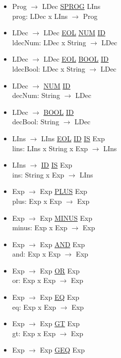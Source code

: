 \documentclass[\main/MemoriaPL.tex]{subfiles}
\begin{document}
    \begin{itemize}
      \item Prog $\rightarrow$ LDec \underline{SPROG} LIns\\
        prog: LDec x LIns $\rightarrow$ Prog
      \item LDec $\rightarrow$ LDec \underline{EOL} \underline{NUM}
        \underline{ID}\\
        ldecNum: LDec x String $\rightarrow$ LDec
      \item LDec $\rightarrow$ LDec \underline{EOL} \underline{BOOL}
        \underline{ID}\\
        ldecBool: LDec x String $\rightarrow$ LDec
      \item LDec $\rightarrow$ \underline{NUM} \underline{ID}\\
        decNum: String $\rightarrow$ LDec
      \item LDec $\rightarrow$ \underline{BOOL} \underline{ID}\\
        decBool: String $\rightarrow$ LDec
      \item LIns $\rightarrow$ LIns \underline{EOL} \underline{ID}
        \underline{IS} Exp\\
        lins: LIns x String x Exp $\rightarrow$ LIns
      \item LIns $\rightarrow$ \underline{ID} \underline{IS} Exp\\
        ins: String x Exp $\rightarrow$ LIns
      \item Exp $\rightarrow$ Exp \underline{PLUS} Exp\\
        plus: Exp x Exp $\rightarrow$ Exp
      \item Exp $\rightarrow$ Exp \underline{MINUS} Exp\\
        minus: Exp x Exp $\rightarrow$ Exp
      \item Exp $\rightarrow$ Exp \underline{AND} Exp\\
        and: Exp x Exp $\rightarrow$ Exp
      \item Exp $\rightarrow$ Exp \underline{OR} Exp\\
        or: Exp x Exp $\rightarrow$ Exp
      \item Exp $\rightarrow$ Exp \underline{EQ} Exp\\
        eq: Exp x Exp $\rightarrow$ Exp
      \item Exp $\rightarrow$ Exp \underline{GT} Exp\\
        gt: Exp x Exp $\rightarrow$ Exp
      \item Exp $\rightarrow$ Exp \underline{GEQ} Exp\\

\end{itemize}
\end{document}
